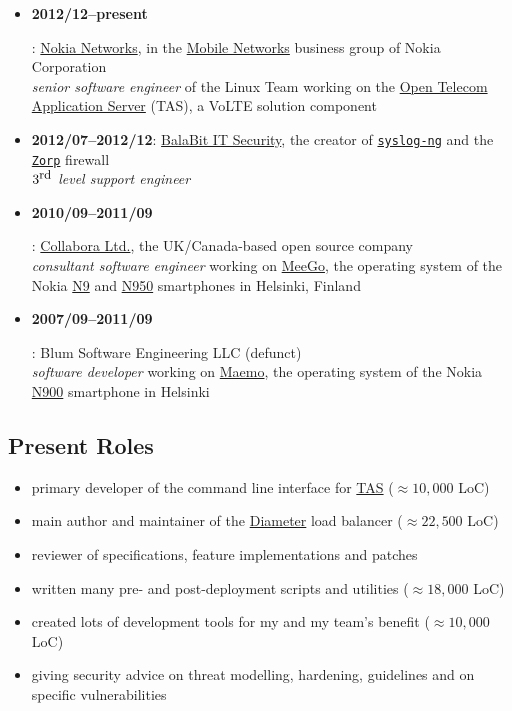 \documentclass[a4paper,12pt]{article}
\newcommand{\compress}{\setlength\itemsep{-\parskip}}
\newenvironment{compressedItemize}{\begin{itemize}\compress}{\end{itemize}}
\begin{document}
\begin{compressedItemize}
\item	\hypertarget{TAS}{\textbf{2012/12--present}}: %
	\href{http://networks.nokia.com}{Nokia Networks}, in the
	\href{http://www.nokia.com/en_int/about-us/who-we-are/our-businesses/mobile-networks}{Mobile Networks} business group of Nokia Corporation \\
	\textit{senior software engineer} of the Linux Team working on the
	\href{http://networks.nokia.com/products/open-telecom-application-server-tas}{Open Telecom Application Server} (TAS), a VoLTE solution component
\item	\textbf{2012/07--2012/12}:
	\href{http://www.balabit.com/solutions/business}{BalaBit IT Security},
	the creator of \href{http://www.balabit.com/network-security/syslog-ng/opensource-logging-system}{\texttt{syslog-ng}} and the
	\href{http://www.balabit.com/network-security/zorp-gpl}%
	{\texttt{Zorp}} firewall \\
	\textit{$3^{\textrm{\small rd}}$ level support engineer}
\item	\hypertarget{MeeGo}{\textbf{2010/09--2011/09}}:
	\href{http://www.collabora.com/about-us}{Collabora Ltd.},
	the UK/Canada-based open source company \\
	\textit{consultant software engineer} working on
	\href{http://en.wikipedia.org/wiki/MeeGo}{MeeGo}, the operating system
	of the Nokia \href{http://en.wikipedia.org/wiki/Nokia_N9}{N9} and
	\href{http://en.wikipedia.org/wiki/Nokia_N950}{N950} smartphones
	in Helsinki, Finland
\item	\hypertarget{Maemo}{\textbf{2007/09--2011/09}}:
	Blum Software Engineering LLC (defunct) \\
	\textit{software developer} working on \href{http://maemo.org}{Maemo},
	the operating system of the Nokia
	\href{http://maemo.org/intro/maemo_history}{N900} smartphone
	in Helsinki
\end{compressedItemize}

\subsection*{Present Roles}

\begin{compressedItemize}
\item	primary developer of the command line interface for
	\hyperlink{TAS}{TAS} ($\approx 10{,}000$ LoC)
\item	main author and maintainer of the
	\href{http://tools.ietf.org/html/rfc6733}{Diameter} load balancer
	($\approx 22{,}500$ LoC)
\item	reviewer of specifications, feature implementations and patches
\item	written many pre- and post-deployment scripts and utilities
	($\approx 18{,}000$ LoC)
\item	created lots of development tools for my and my team's benefit
	($\approx 10{,}000$ LoC)
\item	giving security advice on threat modelling, hardening, guidelines
	and on specific vulnerabilities
\end{compressedItemize}
\end{document}
